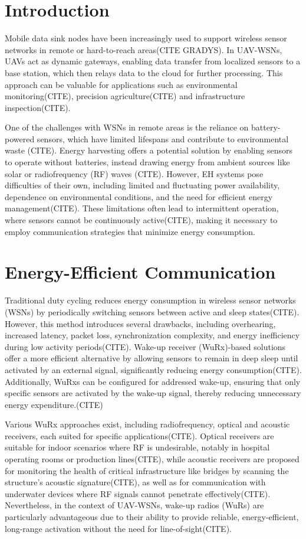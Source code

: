 \documentclass[conference]{IEEEtran}
\begin{document}
\section{Introduction}

Mobile data sink nodes have been increasingly used to support wireless sensor networks in remote or hard-to-reach areas(CITE GRADYS). In UAV-WSNs, UAVs act as dynamic gateways, enabling data transfer from localized sensors to a base station, which then relays data to the cloud for further processing. This approach can be valuable for applications such as environmental monitoring(CITE), precision agriculture(CITE) and infrastructure inspection(CITE).

One of the challenges with WSNs in remote areas is the reliance on battery-powered sensors, which have limited lifespans and contribute to environmental waste (CITE). Energy harvesting offers a potential solution by enabling sensors to operate without batteries, instead drawing energy from ambient sources like solar or radiofrequency (RF) waves (CITE). However, EH systems pose difficulties of their own, including limited and fluctuating power availability, dependence on environmental conditions, and the need for efficient energy management(CITE). These limitations often lead to intermittent operation, where sensors cannot be continuously active(CITE), making it necessary to employ communication strategies that minimize energy consumption.

\section{Energy-Efficient Communication}

Traditional duty cycling reduces energy consumption in wireless sensor networks (WSNs) by periodically switching sensors between active and sleep states(CITE). However, this method introduces several drawbacks, including overhearing, increased latency, packet loss, synchronization complexity, and energy inefficiency during low activity periods(CITE). Wake-up receiver (WuRx)-based solutions offer a more efficient alternative by allowing sensors to remain in deep sleep until activated by an external signal, significantly reducing energy consumption(CITE). Additionally, WuRxs can be configured for addressed wake-up, ensuring that only specific sensors are activated by the wake-up signal, thereby reducing unnecessary energy expenditure.(CITE)

Various WuRx approaches exist, including radiofrequency, optical and acoustic receivers, each suited for specific applications(CITE). Optical receivers are suitable for indoor scenarios where RF is undesirable, notably in hospital operating rooms or production lines(CITE), while acoustic receivers are proposed for monitoring the health of critical infrastructure like bridges by scanning the structure's acoustic signature(CITE), as well as for communication with underwater devices where RF signals cannot penetrate effectively(CITE). Nevertheless, in the context of UAV-WSNs, wake-up radios (WuRs) are particularly advantageous due to their ability to provide reliable, energy-efficient, long-range activation without the need for line-of-sight(CITE).
\end{document}
